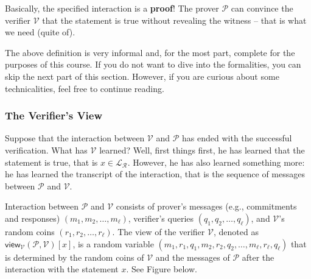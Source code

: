 \documentclass[../lecture-notes.tex]{subfiles}
\begin{document}
Basically, the specified interaction is a \textbf{proof}! The prover $\mathcal{P}$ can convince the verifier $\mathcal{V}$ that the statement is true without revealing the witness -- that is what we need (quite of).

\begin{remark}
    The above definition is very informal and, for the most part, complete for the purposes of this course. If you do not want to dive into the formalities, you can skip the next part of this section. However, if you are curious about some technicalities, feel free to continue reading.
\end{remark}

\subsubsection{The Verifier's View}
Suppose that the interaction between $\mathcal{V}$ and $\mathcal{P}$ has ended with the successful verification. What has $\mathcal{V}$ learned? Well, first things first, he has learned that the statement is true, that is $x \in \mathcal{L}_{\mathcal{R}}$. However, he has also learned something more: he has learned the transcript of the interaction, that is the sequence of messages between $\mathcal{P}$ and $\mathcal{V}$.

\begin{definition}
    Interaction between $\mathcal{P}$ and $\mathcal{V}$ consists of prover's messages (e.g., commitments and responses) $(m_1,m_2,\dots,m_{\ell})$, verifier's queries $(q_1,q_2,\dots,q_{\ell})$, and $\mathcal{V}$'s random coins $(r_1,r_2,\dots,r_{\ell})$. The view of the verifier $\mathcal{V}$, denoted as $\mathsf{view}_{\mathcal{V}}(\mathcal{P},\mathcal{V})[x]$, is a random variable $(m_1,r_1,q_1,m_2,r_2,q_2,\dots,m_{\ell},r_{\ell},q_{\ell})$ that is determined by the random coins of $\mathcal{V}$ and the messages of $\mathcal{P}$ after the interaction with the statement $x$. See Figure below.
\end{definition}
\end{document}
